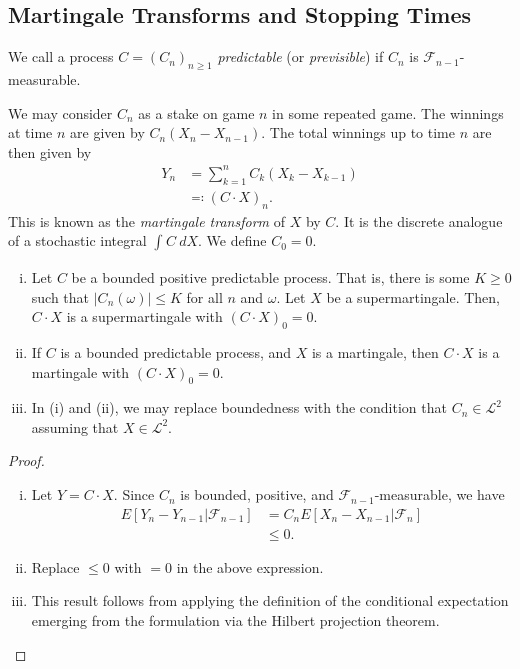 \documentclass[10pt]{mypackage}
\renewcommand{\eqcolon}{\eqqcolon}
\begin{document}
\subsection{Martingale Transforms and Stopping Times}%
\begin{definition}
  We call a process $C = \left( C_n \right)_{n\geq 1}$ \textit{predictable} (or \textit{previsible}) if $C_n$ is $\mathcal{F}_{n-1}$-measurable.
\end{definition}
We may consider $C_n$ as a stake on game $n$ in some repeated game. The winnings at time $n$ are given by $C_n\left( X_n-X_{n-1} \right)$. The total winnings up to time $n$ are then given by
\begin{align*}
  Y_n &= \sum_{k=1}^{n} C_k\left( X_k-X_{k-1} \right)\\
      &\eqcolon \left( C\cdot X \right)_{n}.
\end{align*}
This is known as the \textit{martingale transform} of $X$ by $C$. It is the discrete analogue of a stochastic integral $ \int_{}^{} C\:dX $. We define $C_0 = 0$.
\begin{theorem}\hfill
  \begin{enumerate}[(i)]
    \item Let $C$ be a bounded positive predictable process. That is, there is some $K\geq 0$ such that $\left\vert C_n\left( \omega \right) \right\vert\leq K$ for all $n$ and $\omega$. Let $X$ be a supermartingale. Then, $C\cdot X$ is a supermartingale with $\left( C\cdot X \right)_0 = 0$.
    \item If $C$ is a bounded predictable process, and $X$ is a martingale, then $C\cdot X$ is a martingale with $\left( C\cdot X \right)_0 = 0$.
    \item In (i) and (ii), we may replace boundedness with the condition that $C_n\in \mathcal{L}^2$ assuming that $X\in \mathcal{L}^2$.
  \end{enumerate}
\end{theorem}
\begin{proof}\hfill
  \begin{enumerate}[(i)]
    \item Let $Y = C\cdot X$. Since $C_n$ is bounded, positive, and $\mathcal{F}_{n-1}$-measurable, we have
      \begin{align*}
        E\left[ Y_n-Y_{n-1}|\mathcal{F}_{n-1} \right] &= C_n E\left[ X_n-X_{n-1}|\mathcal{F}_n \right]\\
                                                      &\leq 0.
      \end{align*}
    \item Replace $\leq 0$ with $=0$ in the above expression.
    \item This result follows from applying the definition of the conditional expectation emerging from the formulation via the Hilbert projection theorem.
  \end{enumerate}
\end{proof}
\end{document}
